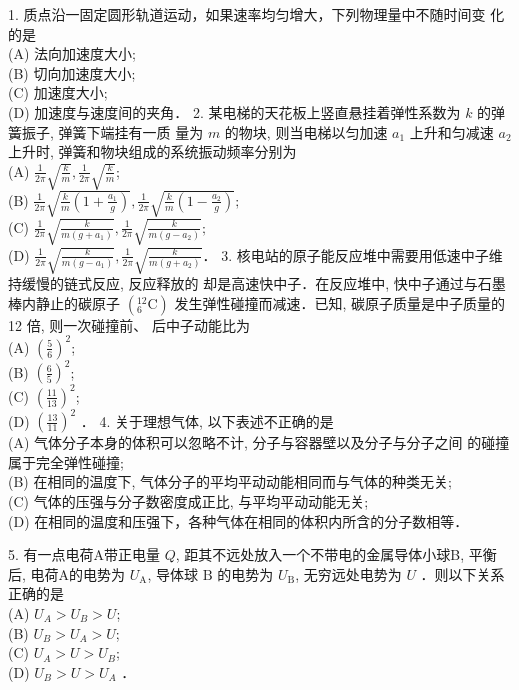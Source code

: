 
1. 质点沿一固定圆形轨道运动，如果速率均匀增大，下列物理量中不随时间变 化的是\\
(A) 法向加速度大小;\\
(B) 切向加速度大小;\\
(C) 加速度大小;\\
(D) 加速度与速度间的夹角．
2. 某电梯的天花板上竖直悬挂着弹性系数为 $k$ 的弹簧振子, 弹簧下端挂有一质 量为 $m$ 的物块, 则当电梯以匀加速 $a_{1}$ 上升和匀减速 $a_{2}$ 上升时, 弹簧和物块组成的系统振动频率分别为\\
(A) $\frac{1}{2 \pi} \sqrt{\frac{k}{m}}, \frac{1}{2 \pi} \sqrt{\frac{k}{m}}$;\\
(B) $\frac{1}{2 \pi} \sqrt{\frac{k}{m}\left(1+\frac{a_{1}}{g}\right)}, \frac{1}{2 \pi} \sqrt{\frac{k}{m}\left(1-\frac{a_{2}}{g}\right)} ;$\\
(C) $\frac{1}{2 \pi} \sqrt{\frac{k}{m\left(g+a_{1}\right)}}, \frac{1}{2 \pi} \sqrt{\frac{k}{m\left(g-a_{2}\right)}} ;$\\
(D) $\frac{1}{2 \pi} \sqrt{\frac{k}{m\left(g-a_{1}\right)}}, \frac{1}{2 \pi} \sqrt{\frac{k}{m\left(g+a_{2}\right)}} ．$
3. 核电站的原子能反应堆中需要用低速中子维持缓慢的链式反应, 反应释放的 却是高速快中子．在反应堆中, 快中子通过与石墨棒内静止的碳原子 $\left({ }_{6}^{12} \mathrm{C}\right)$ 发生弹性碰撞而减速．已知, 碳原子质量是中子质量的 12 倍, 则一次碰撞前、 后中子动能比为\\
(A) $\left(\frac{5}{6}\right)^{2}$;\\
(B) $\left(\frac{6}{5}\right)^{2}$;\\
(C) $\left(\frac{11}{13}\right)^{2}$;\\
(D) $\left(\frac{13}{11}\right)^{2}$ ．
4. 关于理想气体, 以下表述不正确的是\\
(A) 气体分子本身的体积可以忽略不计, 分子与容器壁以及分子与分子之间 的碰撞属于完全弹性碰撞;\\
(B) 在相同的温度下, 气体分子的平均平动动能相同而与气体的种类无关;\\
(C) 气体的压强与分子数密度成正比, 与平均平动动能无关;\\
(D) 在相同的温度和压强下，各种气体在相同的体积内所含的分子数相等．

5. 有一点电荷A带正电量 $Q$, 距其不远处放入一个不带电的金属导体小球B, 平衡后, 电荷A的电势为 $U_{\mathrm{A}}$, 导体球 $\mathrm{B}$ 的电势为 $U_{\mathrm{B}}$, 无穷远处电势为 $U$ ．则以下关系正确的是\\
(A) $U_{A}>U_{B}>U$;\\
(B) $U_{B}>U_{A}>U$;\\
(C) $U_{A}>U>U_{B}$;\\
(D) $U_{B}>U>U_{A}$ ．

